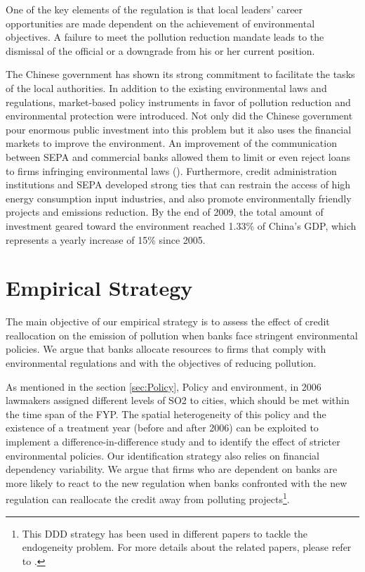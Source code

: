 \documentclass[12pt]{article}
\begin{document}
One of the key elements of the regulation is that local leaders’ career opportunities are made dependent on the achievement of environmental objectives. A failure to meet the pollution reduction mandate leads to the dismissal of the official or a downgrade from his or her current position.

The Chinese government has shown its strong commitment to facilitate the tasks of the local authorities. In addition to the existing environmental laws and regulations, market-based policy instruments in favor of pollution reduction and environmental protection were introduced. Not only did the Chinese government pour enormous public investment into this problem but it also uses the financial markets to improve the environment. An improvement of the communication between SEPA and commercial banks allowed them to limit or even reject loans to firms infringing environmental laws (\cite{Oecd2008-pi}). Furthermore, credit administration institutions and SEPA developed strong ties that can restrain the access of high energy consumption input industries, and also promote environmentally friendly projects and emissions reduction. By the end of 2009, the total amount of investment geared toward the environment reached 1.33\% of China's GDP, which represents a yearly increase of 15\% since 2005. 

\section{Empirical Strategy} \label{sec:Empirical}

The main objective of our empirical strategy is to assess the effect of credit reallocation on the emission of pollution when banks face stringent environmental policies. We argue that banks allocate resources to firms that comply with environmental regulations and with the objectives of reducing pollution.

As mentioned in the section \ref{sec:Policy}, Policy and environment, in 2006 lawmakers assigned different levels of SO2  to cities, which should be met within the time span of the FYP. The spatial heterogeneity of this policy and the existence of a treatment year (before and after 2006) can be exploited to implement a difference-in-difference study and to identify the effect of stricter environmental policies. Our identification strategy also relies on financial dependency variability. We argue that firms who are dependent on banks are more likely to react to the new regulation when banks confronted with the new regulation can reallocate the credit away from polluting projects\footnote{This DDD strategy has been used in different papers to tackle the endogeneity problem. For more details about the related papers, please refer to \cite{Hering2014-af, Cai2016-br, Chen2018-ki, Shi2018-zk}.}.
\end{document}
